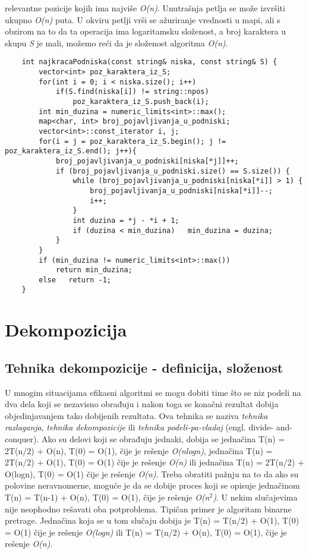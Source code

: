\documentclass{article}
\begin{document}
relevantne pozicije kojih ima najviše \textit{O(n)}. Unutrašnja petlja se može izvršiti ukupno \textit{O(n)} puta. U okviru petlji vrši se ažuriranje
vrednosti u mapi, ali s obzirom na to da ta operacija ima logaritamsku složenost, a broj karaktera u
skupu \textit{S} je mali, možemo reći da je složenost algoritma \textit{O(n)}.
\begin{lstlisting}
    int najkracaPodniska(const string& niska, const string& S) {
        vector<int> poz_karaktera_iz_S;
        for(int i = 0; i < niska.size(); i++)
            if(S.find(niska[i]) != string::npos)
                poz_karaktera_iz_S.push_back(i);
        int min_duzina = numeric_limits<int>::max();
        map<char, int> broj_pojavljivanja_u_podniski;
        vector<int>::const_iterator i, j;
        for(i = j = poz_karaktera_iz_S.begin(); j != poz_karaktera_iz_S.end(); j++){
            broj_pojavljivanja_u_podniski[niska[*j]]++;
            if (broj_pojavljivanja_u_podniski.size() == S.size()) {
                while (broj_pojavljivanja_u_podniski[niska[*i]] > 1) {
                    broj_pojavljivanja_u_podniski[niska[*i]]--;
                    i++;
                }
                int duzina = *j - *i + 1;
                if (duzina < min_duzina)   min_duzina = duzina;
            }
        }
        if (min_duzina != numeric_limits<int>::max())
            return min_duzina;
        else   return -1;
    }
\end{lstlisting}

\section{Dekompozicija}
\subsection{Tehnika dekompozicije - definicija, složenost}
U mnogim situacijama efikasni algoritmi se mogu dobiti time što se niz podeli
na dva dela koji se nezavisno obrađuju i nakon toga se konačni rezultat dobija objedinjavanjem tako dobijenih rezultata. Ova tehnika se naziva \textit{tehnika
razlaganja}, \textit{tehnika dekompozicije} ili \textit{tehnika podeli-pa-vladaj} (engl. divide-
and-conquer). 
\newline
Ako su delovi koji se obrađuju jednaki, dobija se jednačina
T(n) = 2T(n/2) + O(n), T(0) = O(1), čije je rešenje \textit{O(nlogn)}, jednačina
T(n) = 2T(n/2) + O(1), T(0) = O(1) čije je rešenje \textit{O(n)} ili jednačina T(n) = 2T(n/2) + O(logn), T(0) = O(1) čije je rešenje \textit{O(n)}. 
\newline 
Treba obratiti pažnju
na to da ako su polovine neravnomerne, moguće je da se dobije proces koji se
opisuje jednačinom T(n) = T(n-1) + O(n), T(0) = O(1), čije je rešenje \textit{O(n$^2$)}.
\newline
U nekim slučajevima nije neophodno rešavati oba potproblema. Tipičan primer
je algoritam binarne pretrage. Jednačina koja se u tom slučaju dobija je T(n) = T(n/2) + O(1), T(0) = O(1) čije je rešenje \textit{O(logn)} ili T(n) = T(n/2) + O(n), T(0) = O(1), čije je rešenje \textit{O(n)}.
\end{document}
